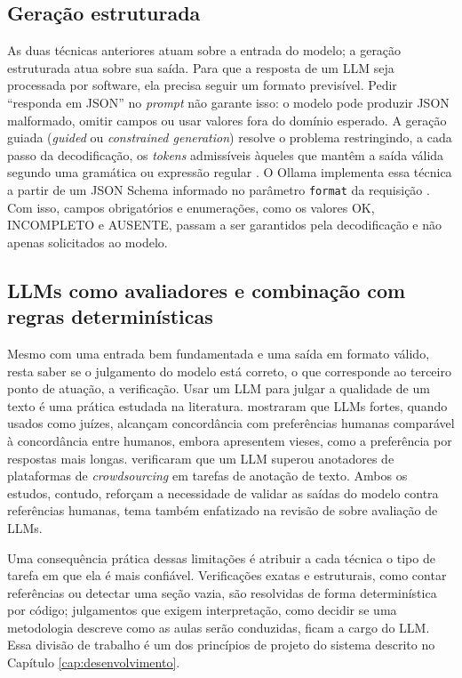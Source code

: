 \subsection{Geração estruturada}

As duas técnicas anteriores atuam sobre a entrada do modelo; a geração estruturada atua sobre sua saída. Para que a resposta de um LLM seja processada por software, ela precisa seguir um formato previsível. Pedir ``responda em JSON'' no \textit{prompt} não garante isso: o modelo pode produzir JSON malformado, omitir campos ou usar valores fora do domínio esperado. A geração guiada (\textit{guided} ou \textit{constrained generation}) resolve o problema restringindo, a cada passo da decodificação, os \textit{tokens} admissíveis àqueles que mantêm a saída válida segundo uma gramática ou expressão regular \cite{Willard2023}. O Ollama implementa essa técnica a partir de um JSON Schema informado no parâmetro \texttt{format} da requisição \cite{OllamaStructured, JSONSchema}. Com isso, campos obrigatórios e enumerações, como os valores OK, INCOMPLETO e AUSENTE, passam a ser garantidos pela decodificação e não apenas solicitados ao modelo.

\subsection{LLMs como avaliadores e combinação com regras determinísticas}

Mesmo com uma entrada bem fundamentada e uma saída em formato válido, resta saber se o julgamento do modelo está correto, o que corresponde ao terceiro ponto de atuação, a verificação. Usar um LLM para julgar a qualidade de um texto é uma prática estudada na literatura.  mostraram que LLMs fortes, quando usados como juízes, alcançam concordância com preferências humanas comparável à concordância entre humanos, embora apresentem vieses, como a preferência por respostas mais longas.  verificaram que um LLM superou anotadores de plataformas de \textit{crowdsourcing} em tarefas de anotação de texto. Ambos os estudos, contudo, reforçam a necessidade de validar as saídas do modelo contra referências humanas, tema também enfatizado na revisão de  sobre avaliação de LLMs.

Uma consequência prática dessas limitações é atribuir a cada técnica o tipo de tarefa em que ela é mais confiável. Verificações exatas e estruturais, como contar referências ou detectar uma seção vazia, são resolvidas de forma determinística por código; julgamentos que exigem interpretação, como decidir se uma metodologia descreve como as aulas serão conduzidas, ficam a cargo do LLM. Essa divisão de trabalho é um dos princípios de projeto do sistema descrito no Capítulo \ref{cap:desenvolvimento}.

